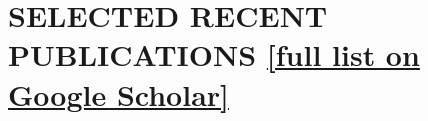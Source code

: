 \documentclass[paper=letter,fontsize=11pt]{scrartcl} %
\newcommand{\NewPart}[2]{\section*{\uppercase{#1} #2}}
\begin{document}

\NewPart{Selected Recent Publications}{\href{https://scholar.google.ch/citations?user=wZ9f8CAAAAAJ}{[full list on Google Scholar]}}
\end{document}
